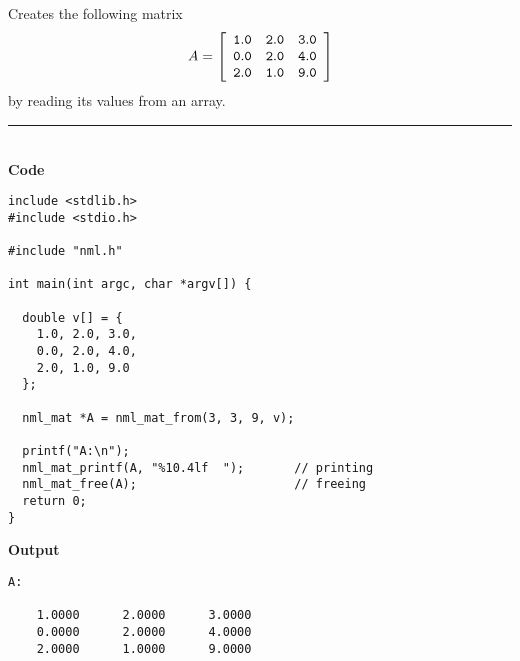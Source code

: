 \example \textsf{Creates the following matrix}
$$
A = \left[
\begin{array}{rrr}
\tt 1.0 & \tt 2.0 & \tt 3.0 \\
\tt 0.0 & \tt 2.0 & \tt 4.0 \\
\tt 2.0 & \tt 1.0 & \tt 9.0
\end{array}
\right]
$$
\textsf{by reading its values from an array}.

\rule{80mm}{0.5pt}\\
{\bf Code}
\begin{verbatim}
include <stdlib.h>
#include <stdio.h>

#include "nml.h"

int main(int argc, char *argv[]) {

  double v[] = {
    1.0, 2.0, 3.0,
    0.0, 2.0, 4.0,
    2.0, 1.0, 9.0
  };

  nml_mat *A = nml_mat_from(3, 3, 9, v);

  printf("A:\n");
  nml_mat_printf(A, "%10.4lf  ");       // printing
  nml_mat_free(A);                      // freeing
  return 0;
}
\end{verbatim}

\hsep
{\bf Output}
\begin{verbatim}
A:

    1.0000      2.0000      3.0000  
    0.0000      2.0000      4.0000  
    2.0000      1.0000      9.0000  
\end{verbatim}
